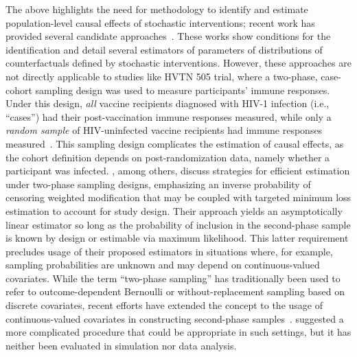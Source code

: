 
The above highlights the need for methodology to identify and estimate
population-level causal effects of stochastic interventions; recent work has
provided several candidate approaches~\citep{diaz2012population,
haneuse2013estimation}. These works show conditions for the identification and
detail several estimators of parameters of distributions of counterfactuals
defined by stochastic interventions. However, these approaches are not directly
applicable to studies like HVTN 505 trial, where a two-phase, case-cohort
sampling design was used to measure participants' immune responses. Under this
design, \emph{all} vaccine recipients diagnosed with HIV-1 infection (i.e.,
``cases'') had their post-vaccination immune responses measured, while only
a \emph{random sample} of HIV-uninfected vaccine recipients had immune responses
measured~\citep{janes2017higher}. This sampling design complicates the
estimation of causal effects, as the cohort definition depends on
post-randomization data, namely whether a participant was infected.
\citet{rose2011targeted2sd}, among others, discuss strategies for efficient
estimation under two-phase sampling designs, emphasizing an inverse probability
of censoring weighted modification that may be coupled with targeted minimum
loss estimation to account for study design. Their approach yields an
asymptotically linear estimator so long as the probability of inclusion in the
second-phase sample is known by design or estimable via maximum likelihood. This
latter requirement precludes usage of their proposed estimators in situations
where, for example, sampling probabilities are unknown and may depend on
continuous-valued covariates. While the term ``two-phase sampling'' has
traditionally been used to refer to outcome-dependent Bernoulli or
without-replacement sampling based on discrete covariates, recent efforts have
extended the concept to the usage of continuous-valued covariates in
constructing second-phase samples~\citep[e.g.,][]{gilbert2014optimal}.
\citet{rose2011targeted2sd} suggested a more complicated procedure that could be
appropriate in such settings, but it has neither been evaluated in simulation
nor data analysis.


